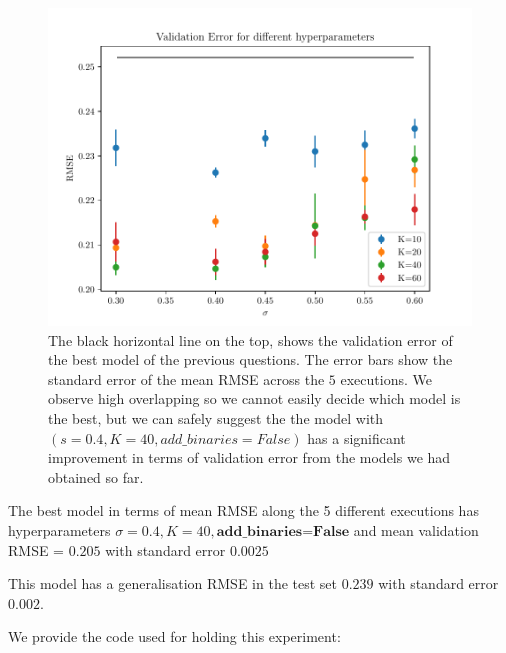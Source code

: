 \documentclass{article}
\begin{document}
\begin{figure}[h]
\includegraphics[scale=0.8]{val_error.pdf}
\caption{The black horizontal line on the top, shows the validation error of the best model of the previous questions. The error bars show the standard error of the mean RMSE across the $5$ executions. We observe high overlapping so we cannot easily decide which model is the best, but we can safely suggest the the model with $(s=0.4, K=40, add\_binaries=False)$ has a significant improvement in terms of validation error from the models we had obtained so far.}
\centering
\label{fig:val_error}
\end{figure}


The best model in terms of mean RMSE along the 5 different executions has hyperparameters $\sigma=0.4, K=40, \textbf{add\_binaries=False}$ and mean validation RMSE = $0.205$ with standard error $0.0025$

This model has a generalisation RMSE in the test set $0.239$ with standard error $0.002$.


We provide the code used for holding this experiment:
\end{document}
